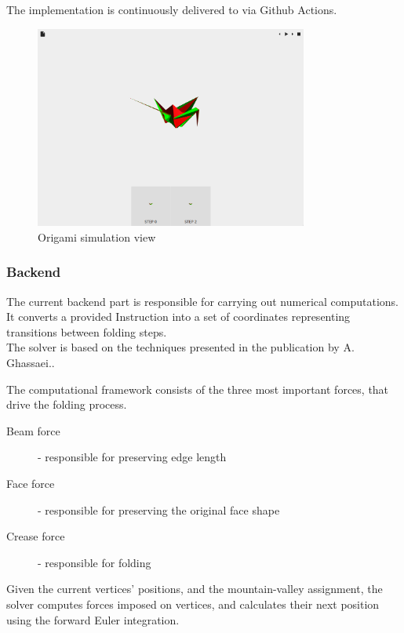 The implementation is continuously delivered to  via Github Actions.


\begin{figure}[H]
\caption{Origami simulation view}
  \centering
    \includegraphics[width=0.8\textwidth]{assets/prototype-front.png}
\end{figure}

\subsubsection{Backend}

The current backend part is responsible for carrying out numerical computations.
It converts a provided Instruction into a set of coordinates representing
transitions between folding steps.\\

The solver is based on the techniques presented in the publication by A. Ghassaei.\cite{origami-simulator}.

The computational framework consists of the three most important forces,
that drive the folding process.

\begin{description}
	\item[Beam force] - responsible for preserving edge length
	\item[Face force] - responsible for preserving the original face shape
	\item[Crease force] - responsible for folding
\end{description}

Given the current vertices' positions, and the mountain-valley assignment,
the solver computes forces imposed on vertices, and calculates their next position
using the forward Euler integration.

